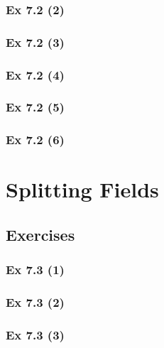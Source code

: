 \subsubsection{Ex 7.2 (2)}\label{sec:Ex_7.2.2}

\subsubsection{Ex 7.2 (3)}\label{sec:Ex_7.2.3}

\subsubsection{Ex 7.2 (4)}\label{sec:Ex_7.2.4}

\subsubsection{Ex 7.2 (5)}\label{sec:Ex_7.2.5}

\subsubsection{Ex 7.2 (6)}\label{sec:Ex_7.2.6}

\newpage		%

\section{Splitting Fields}\label{sec:7.3}
\subsection{Exercises}\label{sec:7.3_Exercises}

\subsubsection{Ex 7.3 (1)}\label{sec:Ex_7.3.1}

\subsubsection{Ex 7.3 (2)}\label{sec:Ex_7.3.2}

\subsubsection{Ex 7.3 (3)}\label{sec:Ex_7.3.3}

